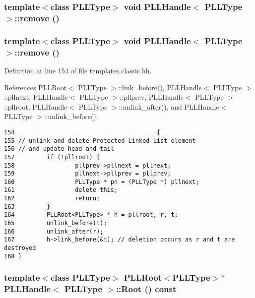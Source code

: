 \subsubsection{\setlength{\rightskip}{0pt plus 5cm}template$<$class PLLType$>$ void PLLHandle$<$ {\bf PLLType} $>$::remove ()\hspace{0.3cm}{\tt  [inline]}}\label{classPLLHandle_a25}


\subsubsection{\setlength{\rightskip}{0pt plus 5cm}template$<$class PLLType$>$ void PLLHandle$<$ {\bf PLLType} $>$::remove ()\hspace{0.3cm}{\tt  [inline]}}\label{classPLLHandle_a12}




Definition at line 154 of file templates.classic.hh.

References PLLRoot$<$ PLLType $>$::link\_\-before(), PLLHandle$<$ PLLType $>$::pllnext, PLLHandle$<$ PLLType $>$::pllprev, PLLHandle$<$ PLLType $>$::pllroot, PLLHandle$<$ PLLType $>$::unlink\_\-after(), and PLLHandle$<$ PLLType $>$::unlink\_\-before().



\footnotesize\begin{verbatim}154                                        { 
155 // unlink and delete Protected Linked List element
156 // and update head and tail
157         if (!pllroot) { 
158                 pllprev->pllnext = pllnext; 
159                 pllnext->pllprev = pllprev; 
160                 PLLType * pn = (PLLType *) pllnext; 
161                 delete this;
162                 return;
163         } 
164         PLLRoot<PLLType> * h = pllroot, r, t; 
165         unlink_before(t); 
166         unlink_after(r); 
167         h->link_before(&t); // deletion occurs as r and t are destroyed
168 } 
\end{verbatim}\normalsize 
{}
\subsubsection{\setlength{\rightskip}{0pt plus 5cm}template$<$class PLLType$>$ {\bf PLLRoot}$<${\bf PLLType}$>$$\ast$ PLLHandle$<$ {\bf PLLType} $>$::Root () const\hspace{0.3cm}{\tt  [inline]}}\label{classPLLHandle_a39}




